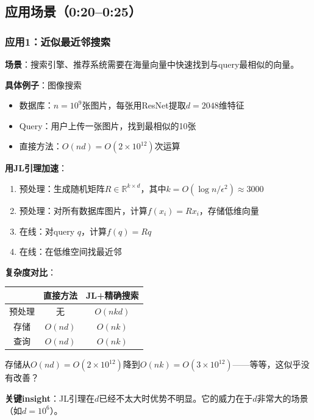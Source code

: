 \documentclass[11pt,a4paper]{ctexart}
\theoremstyle{definition}
\theoremstyle{remark}
\begin{document}
\subsection{应用场景（0:20--0:25）}

\subsubsection{应用1：近似最近邻搜索}

\textbf{场景}：搜索引擎、推荐系统需要在海量向量中快速找到与query最相似的向量。

\textbf{具体例子}：图像搜索
\begin{itemize}
    \item 数据库：$n = 10^9$张图片，每张用ResNet提取$d = 2048$维特征
    \item Query：用户上传一张图片，找到最相似的10张
    \item 直接方法：$O(nd) = O(2 \times 10^{12})$次运算
\end{itemize}

\textbf{用JL引理加速}：
\begin{enumerate}
    \item 预处理：生成随机矩阵$R \in \mathbb{R}^{k \times d}$，其中$k = O(\log n / \epsilon^2) \approx 3000$
    \item 预处理：对所有数据库图片，计算$f(x_i) = Rx_i$，存储低维向量
    \item 在线：对query $q$，计算$f(q) = Rq$
    \item 在线：在低维空间找最近邻
\end{enumerate}

\textbf{复杂度对比}：
\begin{center}
\begin{tabular}{|c|c|c|}
\hline
 & 直接方法 & JL+精确搜索 \\
\hline
预处理 & 无 & $O(nkd)$ \\
存储 & $O(nd)$ & $O(nk)$ \\
查询 & $O(nd)$ & $O(nk)$ \\
\hline
\end{tabular}
\end{center}

存储从$O(nd) = O(2 \times 10^{12})$降到$O(nk) = O(3 \times 10^{12})$——等等，这似乎没有改善？

\textbf{关键insight}：JL引理在$d$已经不太大时优势不明显。它的威力在于$d$非常大的场景（如$d = 10^6$）。
\end{document}
